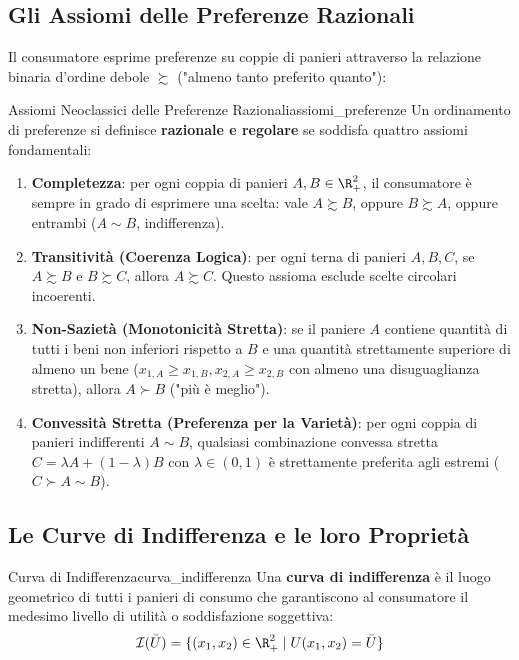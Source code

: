 \subsection{Gli Assiomi delle Preferenze Razionali}
Il consumatore esprime preferenze su coppie di panieri attraverso la relazione binaria d'ordine debole $\succsim$ ("almeno tanto preferito quanto"):

\begin{modello}{Assiomi Neoclassici delle Preferenze Razionali}{assiomi_preferenze}
Un ordinamento di preferenze si definisce \textbf{razionale e regolare} se soddisfa quattro assiomi fondamentali:
\begin{enumerate}
    \item \textbf{Completezza}: per ogni coppia di panieri $A, B \in \R_+^2$, il consumatore è sempre in grado di esprimere una scelta: vale $A \succsim B$, oppure $B \succsim A$, oppure entrambi ($A \sim B$, indifferenza).
    \item \textbf{Transitività (Coerenza Logica)}: per ogni terna di panieri $A, B, C$, se $A \succsim B$ e $B \succsim C$, allora $A \succsim C$. Questo assioma esclude scelte circolari incoerenti.
    \item \textbf{Non-Sazietà (Monotonicità Stretta)}: se il paniere $A$ contiene quantità di tutti i beni non inferiori rispetto a $B$ e una quantità strettamente superiore di almeno un bene ($x_{1,A} \ge x_{1,B}, x_{2,A} \ge x_{2,B}$ con almeno una disuguaglianza stretta), allora $A \succ B$ ("più è meglio").
    \item \textbf{Convessità Stretta (Preferenza per la Varietà)}: per ogni coppia di panieri indifferenti $A \sim B$, qualsiasi combinazione convessa stretta $C = \lambda A + (1-\lambda)B$ con $\lambda \in (0,1)$ è strettamente preferita agli estremi ($C \succ A \sim B$).
\end{enumerate}
\end{modello}

\subsection{Le Curve di Indifferenza e le loro Proprietà}

\begin{definizione}{Curva di Indifferenza}{curva_indifferenza}
Una \textbf{curva di indifferenza} è il luogo geometrico di tutti i panieri di consumo che garantiscono al consumatore il medesimo livello di utilità o soddisfazione soggettiva:
\begin{equation}
    \mathcal{I}(\bar{U}) = \{ (x_1, x_2) \in \R_+^2 \mid U(x_1, x_2) = \bar{U} \}
\end{equation}
\end{definizione}


